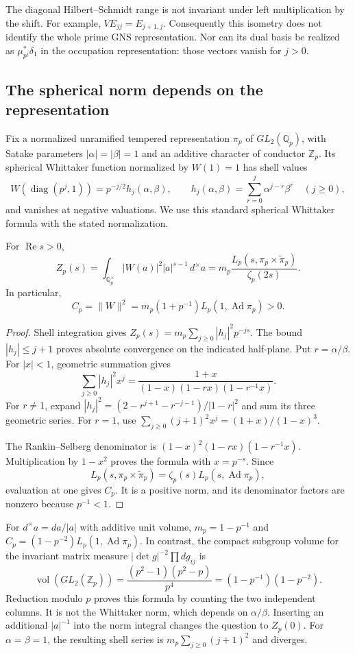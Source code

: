 The diagonal Hilbert--Schmidt range is not invariant under left
multiplication by the shift. For example, $VE_{jj}=E_{j+1,j}$. Consequently
this isometry does not identify the whole prime GNS representation. Nor can
its dual basis be realized as $\mu_{p^j}^*\delta_1$ in the occupation
representation: those vectors vanish for $j>0$.

\subsection{The spherical norm depends on the representation}

Fix a normalized unramified tempered representation $\pi_p$ of $GL_2(\mathbb
Q_p)$, with Satake parameters $|\alpha|=|\beta|=1$ and an additive character
of conductor $\mathbb Z_p$. Its spherical Whittaker function normalized by
$W(1)=1$ has shell values
\[
 W(\operatorname{diag}(p^j,1))
   =p^{-j/2}h_j(\alpha,\beta),\qquad
 h_j(\alpha,\beta)=\sum_{r=0}^j\alpha^{j-r}\beta^r
 \quad(j\geq0),
\]
and vanishes at negative valuations. We use this standard spherical
Whittaker formula with the stated normalization.

\begin{proposition}
\label{v4-arith:traces:spherical-norm}
For $\operatorname{Re}s>0$,
\[
 Z_p(s)=\int_{\mathbb Q_p^\times}|W(a)|^2|a|^{s-1}\,d^\times a
   =m_p\frac{L_p(s,\pi_p\times\widetilde\pi_p)}{\zeta_p(2s)}.
\]
In particular,
\[
 C_p=\|W\|^2
   =m_p(1+p^{-1})L_p(1,\operatorname{Ad}\pi_p)>0.
\]
\end{proposition}
\begin{proof}
Shell integration gives $Z_p(s)=m_p\sum_{j\geq0}|h_j|^2p^{-js}$. The bound
$|h_j|\leq j+1$ proves absolute convergence on the indicated half-plane. Put
$r=\alpha/\beta$. For $|x|<1$, geometric summation gives
\[
 \sum_{j\geq0}|h_j|^2x^j
   =\frac{1+x}{(1-x)(1-rx)(1-r^{-1}x)}.
\]
For $r\ne1$, expand $|h_j|^2=(2-r^{j+1}-r^{-j-1})/|1-r|^2$ and sum its three
geometric series. For $r=1$, use $\sum_{j\geq0}(j+1)^2x^j=(1+x)/(1-x)^3$.

The Rankin--Selberg denominator is $(1-x)^2(1-rx)(1-r^{-1}x)$.
Multiplication by $1-x^2$ proves the formula with $x=p^{-s}$. Since
\[
 L_p(s,\pi_p\times\widetilde\pi_p)
  =\zeta_p(s)L_p(s,\operatorname{Ad}\pi_p),
\]
evaluation at one gives $C_p$. It is a positive norm, and its denominator
factors are nonzero because $p^{-1}<1$.
\end{proof}

For $d^\times a=da/|a|$ with additive unit volume, $m_p=1-p^{-1}$ and
$C_p=(1-p^{-2})L_p(1,\operatorname{Ad}\pi_p)$. In contrast, the compact
subgroup volume for the invariant matrix measure $|\det g|^{-2}\prod
dg_{ij}$ is
\[
 \operatorname{vol}(GL_2(\mathbb Z_p))
    =\frac{(p^2-1)(p^2-p)}{p^4}
    =(1-p^{-1})(1-p^{-2}).
\]
Reduction modulo $p$ proves this formula by counting the two independent
columns. It is not the Whittaker norm, which depends on $\alpha/\beta$.
Inserting an additional $|a|^{-1}$ into the norm integral changes the
question to $Z_p(0)$. For $\alpha=\beta=1$, the resulting shell series is
$m_p\sum_{j\geq0}(j+1)^2$ and diverges.


